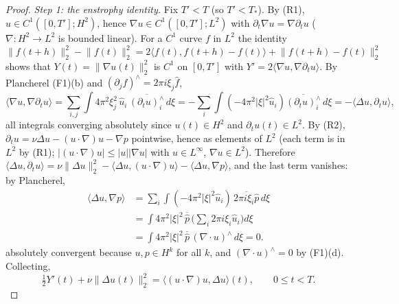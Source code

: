 \documentclass[11pt]{article}
\theoremstyle{definition}
\theoremstyle{plain}
\newcommand{\norm}[1]{\lVert #1\rVert}
\begin{document}
\begin{proof}
\emph{Step 1: the enstrophy identity.}  Fix $T'<T$ (so $T'<T_*$).  By (R1),
$u\in C^1([0,T'];H^2)$, hence $\nabla u\in C^1([0,T'];L^2)$ with
$\partial_t\nabla u=\nabla\partial_tu$ ($\nabla\colon H^2\to L^2$ is bounded
linear).  For a $C^1$ curve $f$ in $L^2$ the identity
$\norm{f(t+h)}_2^2-\norm{f(t)}_2^2=2\langle f(t),f(t+h)-f(t)\rangle+\norm{f(t+h)-f(t)}_2^2$
shows that $Y(t)=\norm{\nabla u(t)}_2^2$ is $C^1$ on $[0,T']$ with
$Y'=2\langle\nabla u,\nabla\partial_tu\rangle$.  By Plancherel (F1)(b) and
$(\partial_jf)^\wedge=2\pi i\xi_j\hat f$,
\[
 \langle\nabla u,\nabla\partial_tu\rangle
 =\sum_{i,j}\int4\pi^2\xi_j^2\,\hat u_i\,\overline{(\partial_tu)^\wedge_i}\,d\xi
 =-\sum_i\int(-4\pi^2|\xi|^2\hat u_i)\overline{(\partial_tu)^\wedge_i}\,d\xi
 =-\langle\Delta u,\partial_tu\rangle ,
\]
all integrals converging absolutely since $u(t)\in H^2$ and $\partial_tu(t)\in L^2$.
By (R2), $\partial_tu=\nu\Delta u-(u\cdot\nabla)u-\nabla p$ pointwise, hence as
elements of $L^2$ (each term is in $L^2$ by (R1); $|(u\cdot\nabla)u|\leq|u||\nabla u|$
with $u\in L^\infty$, $\nabla u\in L^2$).  Therefore
$\langle\Delta u,\partial_tu\rangle=\nu\norm{\Delta u}_2^2-\langle\Delta u,(u\cdot\nabla)u\rangle
-\langle\Delta u,\nabla p\rangle$, and the last term vanishes: by Plancherel,
\[
\begin{aligned}
 \langle\Delta u,\nabla p\rangle
 &=\sum_i\int(-4\pi^2|\xi|^2\hat u_i)
                    \,\overline{2\pi i\xi_i\hat p}\,d\xi\\
 &=\int4\pi^2|\xi|^2\,\overline{\hat p}
                   \,\Big(\sum_i2\pi i\xi_i\hat u_i\Big)d\xi\\
 &=\int4\pi^2|\xi|^2\,\overline{\hat p}
                    \, (\nabla\cdot u)^\wedge\,d\xi=0 .
\end{aligned}
\]
absolutely convergent because $u,p\in H^k$ for all $k$, and
$(\nabla\cdot u)^\wedge=0$ by (F1)(d).  Collecting,
\begin{equation}\label{eq:serrin-enstrophy-identity}
 \tfrac12Y'(t)+\nu\norm{\Delta u(t)}_2^2
 =\big\langle(u\cdot\nabla)u,\Delta u\big\rangle(t),\qquad 0\leq t<T .
\end{equation}


\end{proof}
\end{document}
